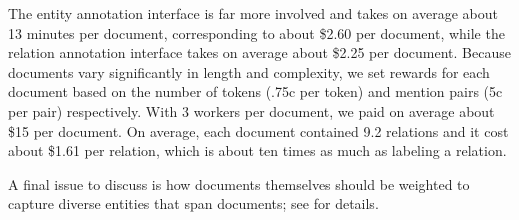 The entity annotation interface is far more involved and takes on average about 13 minutes per document, corresponding to about \$2.60 per document, while the relation annotation interface takes on average about \$2.25 per document.
Because documents vary significantly in length and complexity, we set rewards for each document based on the number of tokens (.75c per token) and mention pairs (5c per pair) respectively.
With 3 workers per document, we paid on average about \$15 per document.
On average, each document contained 9.2 relations and it cost about \$1.61 per relation, which is about ten times as much as labeling a relation.

A final issue to discuss is how documents themselves should be weighted to capture diverse entities that span documents; see  for details.
